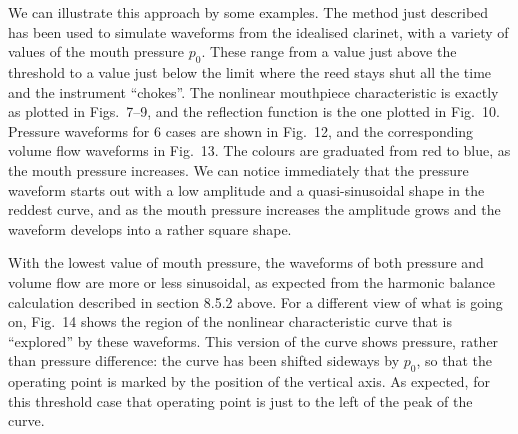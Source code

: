   We can illustrate this approach by some examples. The method just described 
  has been used to simulate waveforms from the idealised clarinet, with a 
  variety of values of the mouth pressure $p_0$. These range from a value just 
  above the threshold to a value just below the limit where the reed stays shut 
  all the time and the instrument ``chokes''. The nonlinear mouthpiece 
  characteristic is exactly as plotted in Figs.\ 7--9, and the reflection 
  function is the one plotted in Fig.\ 10. Pressure waveforms for 6 cases are 
  shown in Fig.\ 12, and the corresponding volume flow waveforms in Fig.\ 13. 
  The colours are graduated from red to blue, as the mouth pressure increases. 
  We can notice immediately that the pressure waveform starts out with a low 
  amplitude and a quasi-sinusoidal shape in the reddest curve, and as the mouth 
  pressure increases the amplitude grows and the waveform develops into a 
  rather square shape. 



  With the lowest value of mouth pressure, the waveforms of both pressure and 
  volume flow are more or less sinusoidal, as expected from the harmonic 
  balance calculation described in section 8.5.2 above. For a different view of 
  what is going on, Fig.\ 14 shows the region of the nonlinear characteristic 
  curve that is ``explored'' by these waveforms. This version of the curve 
  shows pressure, rather than pressure difference: the curve has been shifted 
  sideways by $p_0$, so that the operating point is marked by the position of 
  the vertical axis. As expected, for this threshold case that operating point 
  is just to the left of the peak of the curve. 


